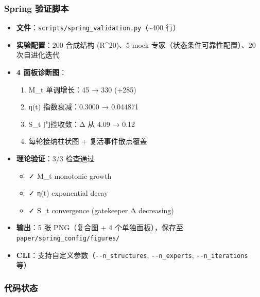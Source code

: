 \documentclass[
  12pt,
]{ctexart}
\providecommand{\tightlist}{%
  \setlength{\itemsep}{0pt}\setlength{\parskip}{0pt}}
\begin{document}
\subsubsection{Spring 验证脚本}\label{spring-ux9a8cux8bc1ux811aux672c}

\begin{itemize}
\tightlist
\item
  \textbf{文件}：\texttt{scripts/spring\_validation.py}（\textasciitilde400
  行）
\item
  \textbf{实验配置}：200 合成结构 (R\^{}20)、5 mock
  专家（状态条件可靠性配置）、20 次自进化迭代
\item
  \textbf{4 面板诊断图}：

  \begin{enumerate}
  \def\labelenumi{\arabic{enumi}.}
  \tightlist
  \item
    \textbar M\_t\textbar{} 单调增长：45 → 330 (+285)
  \item
    η(t) 指数衰减：0.3000 → 0.044871
  \item
    S\_t 门控收敛：Δ 从 4.09 → 0.12
  \item
    每轮接纳柱状图 + 复活事件散点覆盖
  \end{enumerate}
\item
  \textbf{理论验证}：3/3 检查通过

  \begin{itemize}
  \tightlist
  \item
    ✓ M\_t monotonic growth
  \item
    ✓ η(t) exponential decay
  \item
    ✓ S\_t convergence (gatekeeper Δ decreasing)
  \end{itemize}
\item
  \textbf{输出}：5 张 PNG（复合图 + 4 个单独面板），保存至
  \texttt{paper/spring\_config/figures/}
\item
  \textbf{CLI}：支持自定义参数（\texttt{-\/-n\_structures},
  \texttt{-\/-n\_experts}, \texttt{-\/-n\_iterations} 等）
\end{itemize}

\subsubsection{代码状态}\label{ux4ee3ux7801ux72b6ux6001-1}
\end{document}
